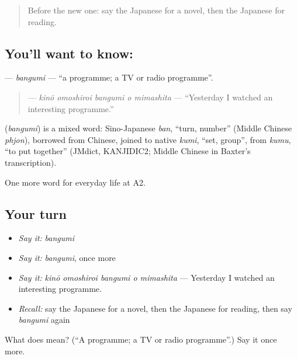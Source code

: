 \begin{quote}
Before the new one: say the Japanese for a novel, then the Japanese for reading.
\end{quote}

\subsection*{You'll want to know: }
\textbf{} — \emph{bangumi} — \textquotedblleft{}a programme; a TV or radio programme\textquotedblright{}.

\begin{quote}
\textbf{   } — \emph{kinō omoshiroi bangumi o mimashita} — \textquotedblleft{}Yesterday I watched an interesting programme.\textquotedblright{}
\end{quote}

\begin{cousinweb}
\textbf{} (\emph{bangumi}) is a mixed word: Sino-Japanese \emph{ban}, \textquotedblleft{}turn, number\textquotedblright{} (Middle Chinese \emph{phjon}), borrowed from Chinese, joined to native \emph{kumi}, \textquotedblleft{}set, group\textquotedblright{}, from \emph{kumu}, \textquotedblleft{}to put together\textquotedblright{} (JMdict, KANJIDIC2; Middle Chinese in Baxter's transcription).
\end{cousinweb}

\begin{grammarlens}[title={What you've built}]
One more word for everyday life at A2.
\end{grammarlens}

\subsection*{Your turn}
\begin{itemize}
\raggedright
  \item \emph{Say it:} \emph{bangumi}
  \item \emph{Say it:} \emph{bangumi}, once more
  \item \emph{Say it:} \emph{kinō omoshiroi bangumi o mimashita} — Yesterday I watched an interesting programme.
  \item \emph{Recall:} say the Japanese for a novel, then the Japanese for reading, then say \emph{bangumi} again
\end{itemize}

\begin{tcolorbox}[breakable,colback=teal!4,colframe=teal!35!black,title={Before you move on}]
What does  mean? (\textquotedblleft{}A programme; a TV or radio programme\textquotedblright{}.) Say it once more.
\end{tcolorbox}
